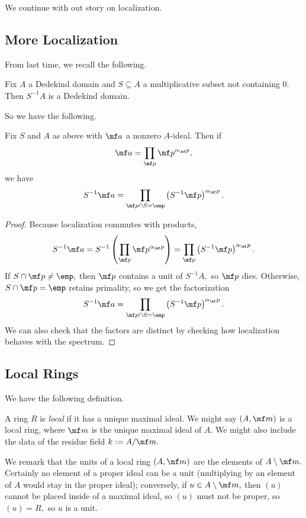 
















We continue with out story on localization.

\subsection{More Localization}
From last time, we recall the following.
\begin{prop}
    Fix $A$ a Dedekind domain and $S\subseteq A$ a multiplicative subset not containing $0.$ Then $S^{-1}A$ is a Dedekind domain.
\end{prop}
So we have the following.
\begin{corollary}
    Fix $S$ and $A$ as above with $\mf a$ a nonzero $A$-ideal. Then if
    \[\mf a=\prod_{\mf p}\mf p^{\alpha_\mf p},\]
    we have
    \[S^{-1}\mf a=\prod_{\mf p\cap S=\emp}\left(S^{-1}\mf p\right)^{\alpha_\mf p}.\]
\end{corollary}
\begin{proof}
    Because localization commutes with products,
    \[S^{-1}\mf a=S^{-1}\left(\prod_{\mf p}\mf p^{\alpha_\mf p}\right)=\prod_{\mf p}\left(S^{-1}\mf p\right)^{\alpha_\mf p}.\]
    If $S\cap\mf p\ne\emp,$ then $\mf p$ contains a unit of $S^{-1}A,$ so $\mf p$ dies. Otherwise, $S\cap\mf p=\emp$ retains primality, so we get the factorization
    \[S^{-1}\mf a=\prod_{\mf p\cap S=\emp}\left(S^{-1}\mf p\right)^{\alpha_\mf p}.\]
    We can also check that the factors are distinct by checking how localization behaves with the spectrum.
\end{proof}

\subsection{Local Rings}
We have the following definition.
\begin{definition}[Local]
    A ring $R$ is \textit{local} if it has a unique maximal ideal. We might say $(A,\mf m)$ is a local ring, where $\mf m$ is the unique maximal ideal of $A.$ We might also include the data of the residue field $k:=A/\mf m.$
\end{definition}
We remark that the units of a local ring $(A,\mf m)$ are the elements of $A\setminus\mf m.$ Certainly no element of a proper ideal can be a unit (multiplying by an element of $A$ would stay in the proper ideal); conversely, if $u\in A\setminus\mf m,$ then $(u)$ cannot be placed inside of a maximal ideal, so $(u)$ must not be proper, so $(u)=R,$ so $u$ is a unit.

